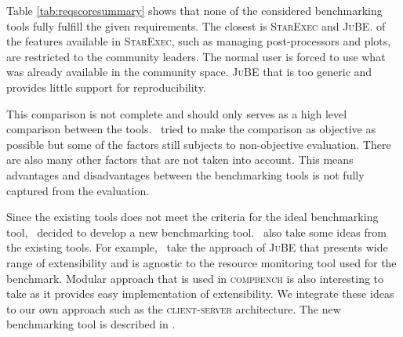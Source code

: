 Table \ref{tab:reqscoresummary} shows that none of the considered benchmarking tools fully fulfill the given requirements.
The closest is \textsc{StarExec} and \textsc{JuBE}.
 of the features available in \textsc{StarExec}, such as managing post-processors and plots, are restricted to the community leaders.
The normal user is forced to use what was already available in the community space.
 \textsc{JuBE} that is too generic and provides little support for reproducibility.

This comparison is not complete and should only serves as a high level comparison between the tools.
\First~tried to make the comparison as objective as possible but some of the factors still subjects to non-objective evaluation.
There are also many other factors that are not taken into account.
This means advantages and disadvantages between the benchmarking tools is not fully captured from the evaluation.

Since the existing tools does not meet the criteria for the ideal benchmarking tool, \first~decided to develop a new benchmarking tool.
\First~also take some ideas from the existing tools.
For example, \first~take the approach of \textsc{JuBE} that presents wide range of extensibility and is agnostic to the resource monitoring tool used for the benchmark.
Modular approach that is used in \textsc{compbench} is also interesting to take as it provides easy implementation of extensibility.
We integrate these ideas to our own approach such as the \textsc{client-server} architecture.
The new benchmarking tool is described in .